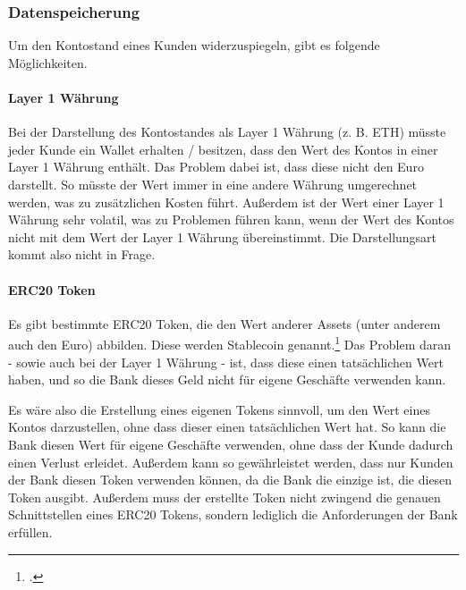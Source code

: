 \subsubsection{Datenspeicherung}
Um den Kontostand eines Kunden widerzuspiegeln, gibt es folgende Möglichkeiten.

\paragraph{Layer 1 Währung}
Bei der Darstellung des Kontostandes als Layer 1 Währung (z. B. ETH) müsste jeder Kunde ein Wallet erhalten / besitzen, dass den Wert des Kontos in einer Layer 1 Währung enthält.
Das Problem dabei ist, dass diese nicht den Euro darstellt. 
So müsste der Wert immer in eine andere Währung umgerechnet werden, was zu zusätzlichen Kosten führt. Außerdem ist der Wert einer Layer 1 Währung sehr volatil, was zu Problemen führen kann, wenn der Wert des Kontos nicht mit dem Wert der Layer 1 Währung übereinstimmt.
Die Darstellungsart kommt also nicht in Frage.

\paragraph{ERC20 Token}


\bigbreak

\noindent
Es gibt bestimmte ERC20 Token, die den Wert anderer Assets (unter anderem auch den Euro) abbilden. Diese werden Stablecoin genannt.\footcite[Vgl. hierzu und weiterführend][4]{q8}
Das Problem daran - sowie auch bei der Layer 1 Währung - ist, dass diese einen tatsächlichen Wert haben, und so die Bank dieses Geld nicht für eigene Geschäfte verwenden kann.

\bigbreak

\label{datenspeicherung:neuer-token}
\noindent
Es wäre also die Erstellung eines eigenen Tokens sinnvoll, um den Wert eines Kontos darzustellen, ohne dass dieser einen tatsächlichen Wert hat. So kann die Bank diesen Wert für eigene Geschäfte verwenden, ohne dass der Kunde dadurch einen Verlust erleidet. 
Außerdem kann so gewährleistet werden, dass nur Kunden der Bank diesen Token verwenden können, da die Bank die einzige ist, die diesen Token ausgibt.
Außerdem muss der erstellte Token nicht zwingend die genauen Schnittstellen eines ERC20 Tokens, sondern lediglich die Anforderungen der Bank erfüllen.

